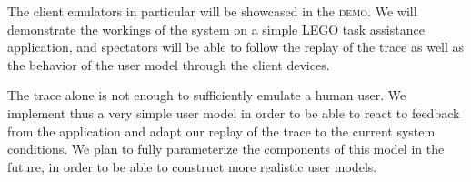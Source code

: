 \documentclass[portrait, a1]{KTHEEposter}
\begin{document}
\begin{pcolumns}[3]
\begin{pcolumn}[2]
\begin{pframe}[1.1]
                The client emulators in particular will be showcased in the \textsc{demo}.
                We will demonstrate the workings of the system on a simple LEGO task assistance application, and spectators will be able to follow the replay of the trace as well as the behavior of the user model through the client devices.
            \end{pframe}
            \begin{pframe}[.9]
                \begin{center}
                    \medskip
                    
                    \medskip
                \end{center}
                The trace alone is not enough to sufficiently emulate a human user.
                We implement thus a very simple user model in order to be able to react to feedback from the application and adapt our replay of the trace to the current system conditions.
                We plan to fully parameterize the components of this model in the future, in order to be able to construct more realistic user models.
            \end{pframe}        
        \end{pcolumn}%
        \begin{pcolumn}[3]
            \begin{pframe}[1.95]

\end{pframe}
\end{pcolumn}
\end{pcolumns}
\end{document}
